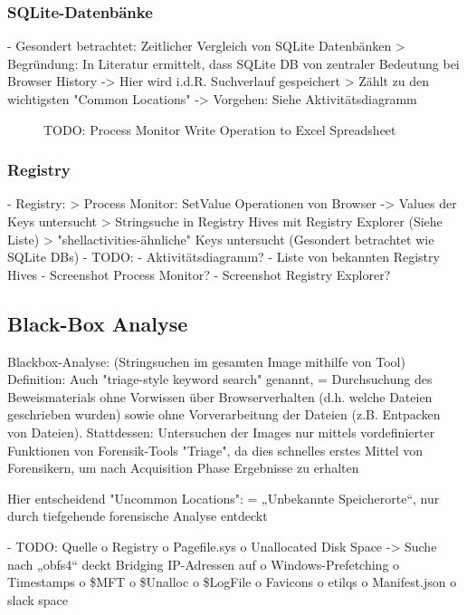 \subsubsection*{SQLite-Datenbänke}
- Gesondert betrachtet: Zeitlicher Vergleich von SQLite Datenbänken
	> Begründung: In Literatur ermittelt, dass SQLite DB von zentraler Bedeutung bei Browser History -> Hier wird i.d.R. Suchverlauf gespeichert
	> Zählt zu den wichtigsten "Common Locations"
	-> Vorgehen: Siehe Aktivitätsdiagramm
\begin{figure}[h!]
	\centering
	\small
	\centerline{\resizebox{\linewidth}{!}{}}
	\caption{TODO: Process Monitor Write Operation to Excel Spreadsheet}
	\label{fig:jes}
\end{figure}

\subsubsection*{Registry}
- Registry:
	> Process Monitor: SetValue Operationen von Browser -> Values der Keys untersucht
	> Stringsuche in Registry Hives mit Registry Explorer (Siehe Liste)
	> "shellactivities-ähnliche" Keys untersucht (Gesondert betrachtet wie SQLite DBs)
- TODO: 
	- Aktivitätsdiagramm?
	- Liste von bekannten Registry Hives
	- Screenshot Process Monitor?
	- Screenshot Registry Explorer?

\subsection{Black-Box Analyse}

Blackbox-Analyse: \cite{Bonetti.2014} (Stringsuchen im gesamten Image mithilfe von Tool) 
Definition: Auch "triage-style keyword search" \cite{Horsman.2019} genannt, = Durchsuchung des Beweismaterials ohne 
Vorwissen über Browserverhalten (d.h. welche Dateien geschrieben wurden) sowie ohne Vorverarbeitung der Dateien (z.B. Entpacken von Dateien).
Stattdessen: Untersuchen der Images nur mittels vordefinierter Funktionen von Forensik-Tools
"Triage", da dies schnelles erstes Mittel von Forensikern, um nach Acquisition Phase Ergebnisse zu erhalten

Hier entscheidend "Uncommon Locations":
	= „Unbekannte Speicherorte“, nur durch tiefgehende forensische Analyse entdeckt
	
	- TODO: Quelle
	o	Registry
	o	Pagefile.sys
	o	Unallocated Disk Space
	->	Suche nach „obfs4“ deckt Bridging IP-Adressen auf
	o	Windows-Prefetching
	o	Timestamps
	o	\$MFT
	o	\$Unalloc
	o	\$LogFile
	o	Favicons
	o	etilqs
	o	Manifest.json
	o	slack space
	
